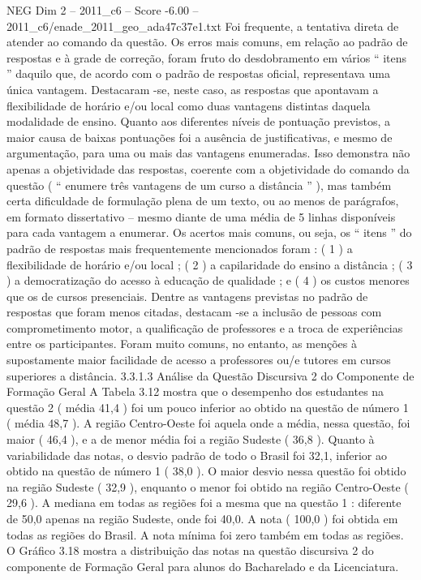 \begin{textsample}{NEG Dim 2 – 2011\_c6 – Score -6.00 – 2011\_c6/enade\_2011\_geo\_ada47c37e1.txt}
Foi frequente, a tentativa direta de atender ao comando da questão.
Os erros mais comuns, em relação ao padrão de respostas e à grade de correção, foram fruto do desdobramento em vários “ itens ” daquilo que, de acordo com o padrão de respostas oficial, representava uma única vantagem.
Destacaram -se, neste caso, as respostas que apontavam a flexibilidade de horário e/ou local como duas vantagens distintas daquela modalidade de ensino.
Quanto aos diferentes níveis de pontuação previstos, a maior causa de baixas pontuações foi a ausência de justificativas, e mesmo de argumentação, para uma ou mais das vantagens enumeradas.
Isso demonstra não apenas a objetividade das respostas, coerente com a objetividade do comando da questão ( “ enumere três vantagens de um curso a distância ” ), mas também certa dificuldade de formulação plena de um texto, ou ao menos de parágrafos, em formato dissertativo – mesmo diante de uma média de 5 linhas disponíveis para cada vantagem a enumerar.
Os acertos mais comuns, ou seja, os “ itens ” do padrão de respostas mais frequentemente mencionados foram : ( 1 ) a flexibilidade de horário e/ou local ; ( 2 ) a capilaridade do ensino a distância ; ( 3 ) a democratização do acesso à educação de qualidade ; e ( 4 ) os custos menores que os de cursos presenciais.
Dentre as vantagens previstas no padrão de respostas que foram menos citadas, destacam -se a inclusão de pessoas com comprometimento motor, a qualificação de professores e a troca de experiências entre os participantes.
Foram muito comuns, no entanto, as menções à supostamente maior facilidade de acesso a professores ou/e tutores em cursos superiores a distância. 3.3.1.3 Análise da Questão Discursiva 2 do Componente de Formação Geral A Tabela 3.12 mostra que o desempenho dos estudantes na questão 2 ( média 41,4 ) foi um pouco inferior ao obtido na questão de número 1 ( média 48,7 ).
A região Centro-Oeste foi aquela onde a média, nessa questão, foi maior ( 46,4 ), e a de menor média foi a região Sudeste ( 36,8 ).
Quanto à variabilidade das notas, o desvio padrão de todo o Brasil foi 32,1, inferior ao obtido na questão de número 1 ( 38,0 ).
O maior desvio nessa questão foi obtido na região Sudeste ( 32,9 ), enquanto o menor foi obtido na região Centro-Oeste ( 29,6 ).
A mediana em todas as regiões foi a mesma que na questão 1 : diferente de 50,0 apenas na região Sudeste, onde foi 40,0.
A nota ( 100,0 ) foi obtida em todas as regiões do Brasil.
A nota mínima foi zero também em todas as regiões.
O Gráfico 3.18 mostra a distribuição das notas na questão discursiva 2 do componente de Formação Geral para alunos do Bacharelado e da Licenciatura.

\end{textsample}

